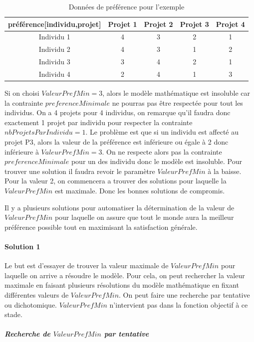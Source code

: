 \documentclass[final,poster]{polytech/polytech}
\begin{document}
\begin{table}
\caption{\label{tab:preference_exemple}Données de préférence pour l'exemple}
\begin{tabular}{|c|c|c|c|c|}
\hline
préférence[individu,projet] & Projet 1 & Projet 2 & Projet 3 & Projet 4 \\
\hline
Individu 1 & 4 & 3 & 2 & 1 \\
\hline
Individu 2 & 4 & 3 & 1 & 2 \\
\hline
Individu 3 & 3 & 4 & 2 & 1 \\
\hline
Individu 4 & 2 & 4 & 1 & 3 \\
\hline
\end{tabular}
\end{table}

Si on choisi $ValeurPrefMin=3$, alors le modèle mathématique est insoluble car la contrainte $preferenceMinimale$ ne pourras pas être respectée pour tout les individus. On a 4 projets pour 4 individus, on remarque qu'il faudra donc exactement 1 projet par individu pour respecter la contrainte $nbProjetsParIndividu=1$. Le problème est que si un individu est affecté au projet P3, alors la valeur de la préférence est inférieure ou égale à 2 donc inférieure à $ValeurPrefMin=3$. On ne respecte alors pas la contrainte $preferenceMinimale$ pour un des individu donc le modèle est insoluble.
Pour trouver une solution il faudra revoir le paramètre $ValeurPrefMin$ à la baisse. Pour la valeur 2, on commencera a trouver des solutions pour laquelle la $ValeurPrefMin$ est maximale. Donc les bonnes solutions de compromis.

Il y a plusieurs solutions pour automatiser la détermination de la valeur de $ValeurPrefMin$ pour laquelle on assure que tout le monde aura la meilleur préférence possible tout en maximisant la satisfaction générale.

\paragraph{Solution 1}
Le but est d'essayer de trouver la valeur maximale de $ValeurPrefMin$ pour laquelle on arrive a résoudre le modèle. Pour cela, on peut rechercher la valeur maximale en faisant plusieurs résolutions du modèle mathématique en fixant différentes valeurs de $ValeurPrefMin$. On peut faire une recherche par tentative ou dichotomique. $ValeurPrefMin$ n'intervient pas dans la fonction objectif à ce stade.

\subparagraph{Recherche de $ValeurPrefMin$ par tentative}
\end{document}
